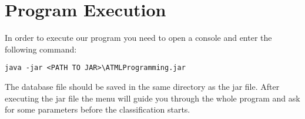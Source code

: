 \section{Program Execution}
\label{program_execution}

In order to execute our program you need to open a console and enter the following command:
\begin{center}
	\texttt{java -jar <PATH TO JAR>\textbackslash ATMLProgramming.jar}
\end{center}
The database file should be saved in the same directory as the jar file.
After executing the jar file the menu will guide you through the whole program and ask for some parameters before the classification starts.
